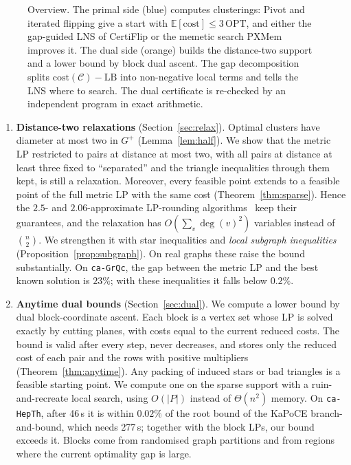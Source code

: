 \documentclass[11pt]{article}
\theoremstyle{definition}
\newcommand{\OPT}{\mathrm{OPT}}
\newcommand{\cost}{\mathrm{cost}}
\newcommand{\LB}{\mathrm{LB}}
\begin{document}
\begin{figure}[!tbp]
\centering
\resizebox{\textwidth}{!}{}
\caption{Overview.  The primal side (blue) computes clusterings: Pivot and
iterated flipping give a start with $\mathbb E[\cost]\le3\,\OPT$, and either
the gap-guided LNS of CertiFlip or the memetic search PXMem improves it.  The
dual side (orange) builds the distance-two support and a lower bound by block
dual ascent.  The gap decomposition splits $\cost(\mathcal C)-\LB$ into
non-negative local terms and tells the LNS where to search.  The dual
certificate is re-checked by an independent program in exact arithmetic.}
\label{fig:overview}
\end{figure}

\begin{enumerate}
\item \textbf{Distance-two relaxations} (Section~\ref{sec:relax}).  Optimal
clusters have diameter at most two in $G^+$ (Lemma~\ref{lem:half}).  We show
that the metric LP restricted to pairs at distance at most two, with all pairs
at distance at least three fixed to ``separated'' and the triangle
inequalities through them kept, is still a relaxation.  Moreover, every
feasible point extends to a feasible point of the full metric LP with the same
cost (Theorem~\ref{thm:sparse}).  Hence the $2.5$- and $2.06$-approximate
LP-rounding algorithms~\citep{AilonCN08,ChawlaMSY15} keep their guarantees,
and the relaxation has $O(\sum_v\deg(v)^2)$ variables instead of
$\binom{n}{2}$.  We strengthen it with star inequalities and \emph{local
subgraph inequalities} (Proposition~\ref{prop:subgraph}).  On real graphs
these raise the bound substantially.  On \texttt{ca-GrQc}, the gap between
the metric LP and the best known solution is $23\%$; with these inequalities
it falls below $0.2\%$.

\item \textbf{Anytime dual bounds} (Section~\ref{sec:dual}).  We compute a
lower bound by dual block-coordinate ascent.  Each block is a vertex set whose
LP is solved exactly by cutting planes, with costs equal to the current
reduced costs.  The bound is valid after every step, never decreases, and
stores only the reduced cost of each pair and the rows with positive
multipliers (Theorem~\ref{thm:anytime}).  Any packing of induced stars or bad
triangles is a feasible starting point.  We compute one on the sparse support with a
ruin-and-recreate local search, using $O(|P|)$ instead of $\Theta(n^2)$
memory.  On \texttt{ca-HepTh}, after 46\,s it is within $0.02\%$ of the
root bound of the KaPoCE branch-and-bound, which needs 277\,s; together with
the block LPs, our bound exceeds it.  Blocks come from randomised
graph partitions and from regions where the current optimality gap is large.


\end{enumerate}
\end{document}
